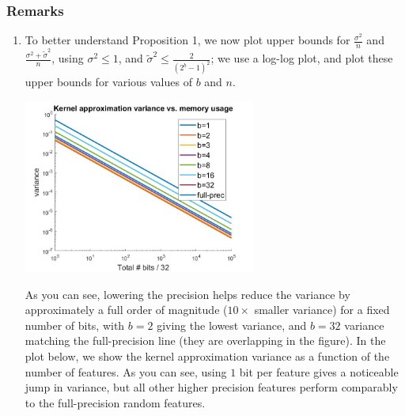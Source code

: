 \documentclass[12pt]{article}
\newcommand{\tsigma}{\tilde{\sigma}}
\begin{document}
\subsubsection{Remarks}
\begin{enumerate}
\item To better understand Proposition 1, we now plot upper bounds for $\frac{\sigma^2}{n}$ and $\frac{\sigma^2 + \tsigma^2}{n}$, using $\sigma^2\leq 1$, and $\tsigma^2 \leq  \frac{2}{(2^b-1)^2}$; we use a log-log plot, and plot these upper bounds for various values of $b$ and $n$.\\
\begin{center}
	\includegraphics[width=0.6\textwidth]{lprff_variance_figure_numbits.jpg}
\end{center}
As you can see, lowering the precision helps reduce the variance by approximately a full order of magnitude ($10\times$ smaller variance) for a fixed number of bits, with $b=2$ giving the lowest variance, and $b=32$ variance matching the full-precision line (they are overlapping in the figure).  In the plot below, we show the kernel approximation variance as a function of the number of features.  As you can see, using $1$ bit per feature gives a noticeable jump in variance, but all other higher precision features perform comparably to the full-precision random features.


\end{enumerate}
\end{document}
